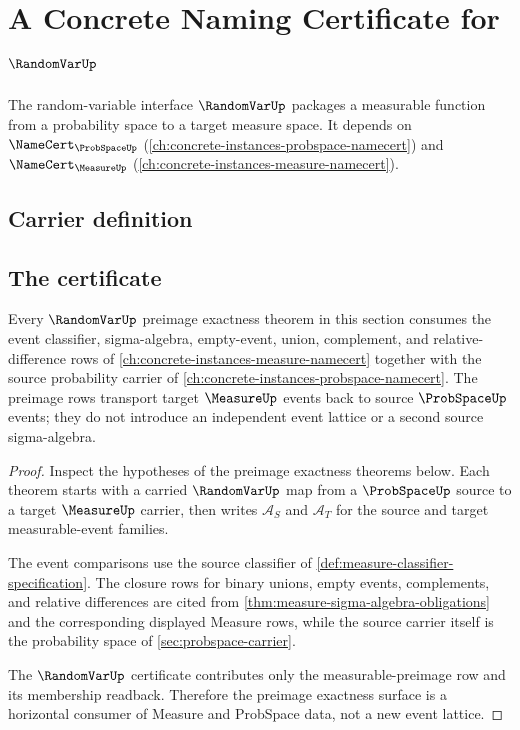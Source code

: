\chapter{A Concrete Naming Certificate for $\RandomVarUp$}
\label{ch:concrete-instances-randomvar-namecert}

The random-variable interface $\RandomVarUp$ packages a measurable function from a probability space to a target measure space. It depends on $\NameCert_{\ProbSpaceUp}$ (\autoref{ch:concrete-instances-probspace-namecert}) and $\NameCert_{\MeasureUp}$ (\autoref{ch:concrete-instances-measure-namecert}).

\section{Carrier definition}
\label{sec:randomvar-carrier}

\section{The certificate}
\label{sec:randomvar-certificate}

\begin{theorem}
\label{thm:randomvar-preimage-measure-probspace-lattice-link}
Every $\RandomVarUp$ preimage exactness theorem in this section consumes the event classifier, sigma-algebra, empty-event, union, complement, and relative-difference rows of \autoref{ch:concrete-instances-measure-namecert} together with the source probability carrier of \autoref{ch:concrete-instances-probspace-namecert}. The preimage rows transport target $\MeasureUp$ events back to source $\ProbSpaceUp$ events; they do not introduce an independent event lattice or a second source sigma-algebra.
\end{theorem}
\begin{proof}
Inspect the hypotheses of the preimage exactness theorems below. Each theorem starts with a carried $\RandomVarUp$ map from a $\ProbSpaceUp$ source to a target $\MeasureUp$ carrier, then writes $\mathcal{A}_S$ and $\mathcal{A}_T$ for the source and target measurable-event families.

The event comparisons use the source classifier of \autoref{def:measure-classifier-specification}. The closure rows for binary unions, empty events, complements, and relative differences are cited from \autoref{thm:measure-sigma-algebra-obligations} and the corresponding displayed Measure rows, while the source carrier itself is the probability space of \autoref{sec:probspace-carrier}.

The $\RandomVarUp$ certificate contributes only the measurable-preimage row and its membership readback. Therefore the preimage exactness surface is a horizontal consumer of Measure and ProbSpace data, not a new event lattice.
\end{proof}

